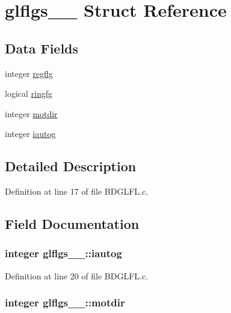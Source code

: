 \hypertarget{structglflgs__1__}{}\section{glflgs\+\_\+\_\+ Struct Reference}
\label{structglflgs__1__}
\subsection*{Data Fields}
\begin{DoxyCompactItemize}
\item 
integer \hyperlink{structglflgs__1___a8172c953ebbdb50f8fb446a44e8377e6}{regflg}
\item 
logical \hyperlink{structglflgs__1___ad7c10f857b052aaef265cd68bc1ad905}{ringfg}
\item 
integer \hyperlink{structglflgs__1___a26b3bdc2662c9092e19185f3ecc995fc}{motdir}
\item 
integer \hyperlink{structglflgs__1___a2aa84750ed7dffbf29d6a4dd4822e094}{iautog}
\end{DoxyCompactItemize}


\subsection{Detailed Description}


Definition at line 17 of file B\+D\+G\+L\+F\+L.\+c.



\subsection{Field Documentation}
\subsubsection[{\texorpdfstring{iautog}{iautog}}]{\setlength{\rightskip}{0pt plus 5cm}integer glflgs\+\_\+\_\+\+::iautog}\hypertarget{structglflgs__1___a2aa84750ed7dffbf29d6a4dd4822e094}{}\label{structglflgs__1___a2aa84750ed7dffbf29d6a4dd4822e094}


Definition at line 20 of file B\+D\+G\+L\+F\+L.\+c.

\subsubsection[{\texorpdfstring{motdir}{motdir}}]{\setlength{\rightskip}{0pt plus 5cm}integer glflgs\+\_\+\_\+\+::motdir}\hypertarget{structglflgs__1___a26b3bdc2662c9092e19185f3ecc995fc}{}\label{structglflgs__1___a26b3bdc2662c9092e19185f3ecc995fc}


